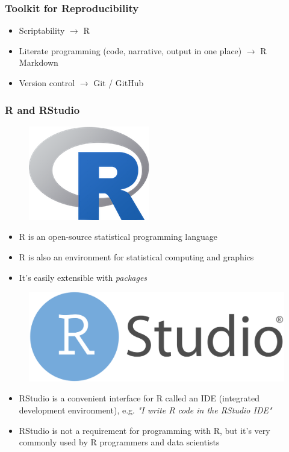 \documentclass[11pt]{beamer}
\begin{document}
\begin{frame}
	
	
	\frametitle{\textbf{Toolkit for Reproducibility}}
	
	\begin{itemize}
		\item Scriptability $\rightarrow$ R
		\item Literate programming (code, narrative, output in one place) $\rightarrow$ R Markdown
		\item Version control $\rightarrow$ Git / GitHub
	\end{itemize}
\end{frame}
	
	
	\begin{frame}
		
		
		\frametitle{\textbf{R and RStudio}}
		
	\begin{minipage}[t]{0.5\linewidth}
		\vspace{-1em}
		\begin{figure}
			\centering
			\includegraphics[width=0.2\linewidth]{Images/S1/r-logo}
			\label{fig:r-logo}
		\end{figure}
		
		\begin{itemize}
			\item R is an open-source statistical programming language
			\item R is also an environment for statistical computing and graphics
			\item It's easily extensible with \textit{packages}
		\end{itemize}   
	\end{minipage}%
	\begin{minipage}[t]{0.5\linewidth}
		\vspace{-1em}
	\begin{figure}
		\centering
		\includegraphics[width=0.4\linewidth]{Images/S1/RStudio_logo}
		\label{fig:rstudiologo}
	\end{figure}
	\vspace{-1em}
	\begin{itemize}
		\item RStudio is a convenient interface for R called an IDE (integrated development environment), e.g. \textit{"I write R code in the RStudio IDE"}
		\item RStudio is not a requirement for programming with R, but it's very commonly used by R programmers and data scientists
	\end{itemize}   


\end{minipage}
\end{frame}
\end{document}
